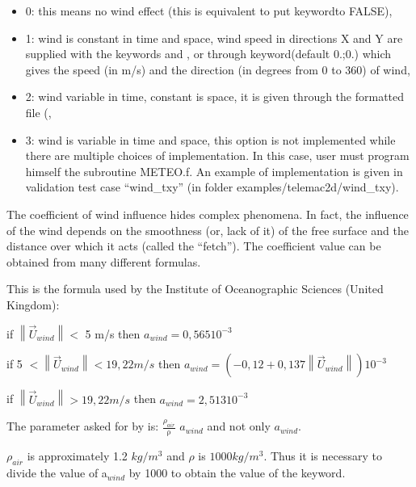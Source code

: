 \begin{itemize}
\item [\nonumber] 0: this means no wind effect (this is equivalent to put keywordto FALSE),

\item [\nonumber]1: wind is constant in time and space, wind speed in directions X and Y are supplied with the keywords  and , or through keyword(default 0.;0.) which gives the speed (in m/s) and the direction (in degrees from 0 to 360) of wind,

\item [\nonumber] 2: wind variable in time, constant is space, it is given through the formatted file (,

\item [\nonumber] 3: wind is variable in time and space, this option is not implemented while there are multiple choices of implementation. In this case, user must program himself the subroutine METEO.f. An example of implementation is given in validation test case ``wind\_txy'' (in folder examples/telemac2d/wind\_txy).
\end{itemize}

 The coefficient of wind influence hides complex phenomena. In fact, the influence of the wind depends on the smoothness (or, lack of it) of the free surface and the distance over which it acts (called the ``fetch''). The coefficient value can be obtained from many different formulas.

 This is the formula used by the Institute of Oceanographic Sciences (United Kingdom):



 if    $\left \|\vec{U}_{wind} \right \| <$ 5 m/s   then   $a_{wind}  = 0,565 10^{-3}$

 if  5   $< \left \| \vec{U}_{wind}  \right \| < 19,22 m/s$ then    $a_{wind} = (- 0,12 + 0,137 \left \| \vec{U}_{wind}   \right \|) 10^{-3}$

 if    $\left \| \vec{U}_{wind}  \right \|   > 19,22 m/s $  then     $a_{wind} = 2,513 10^{-3}$

 The parameter  asked for by  is: $\frac{{\rho }_{air}}{\mathrm{\rho }}$ $a_{wind}$ and not only $a_{wind}$.

 $\rho_{air}$ is approximately 1.2 $kg/m^3$ and $\rho$ is $1000 kg/m^3$. Thus it is necessary to divide the value of a${}_{wind}$ by 1000 to obtain the value of the  keyword.

